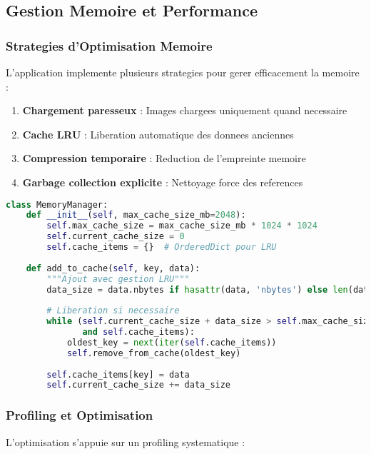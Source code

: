 \documentclass[12pt,a4paper]{article}
\begin{document}
\subsection{Gestion Memoire et Performance}

\subsubsection{Strategies d'Optimisation Memoire}

L'application implemente plusieurs strategies pour gerer efficacement la memoire :

\begin{enumerate}
\item \textbf{Chargement paresseux} : Images chargees uniquement quand necessaire
\item \textbf{Cache LRU} : Liberation automatique des donnees anciennes
\item \textbf{Compression temporaire} : Reduction de l'empreinte memoire
\item \textbf{Garbage collection explicite} : Nettoyage force des references
\end{enumerate}

\begin{lstlisting}[language=Python]
class MemoryManager:
    def __init__(self, max_cache_size_mb=2048):
        self.max_cache_size = max_cache_size_mb * 1024 * 1024
        self.current_cache_size = 0
        self.cache_items = {}  # OrderedDict pour LRU
        
    def add_to_cache(self, key, data):
        """Ajout avec gestion LRU"""
        data_size = data.nbytes if hasattr(data, 'nbytes') else len(data)
        
        # Liberation si necessaire
        while (self.current_cache_size + data_size > self.max_cache_size 
               and self.cache_items):
            oldest_key = next(iter(self.cache_items))
            self.remove_from_cache(oldest_key)
        
        self.cache_items[key] = data
        self.current_cache_size += data_size
\end{lstlisting}

\subsubsection{Profiling et Optimisation}

L'optimisation s'appuie sur un profiling systematique :
\end{document}
